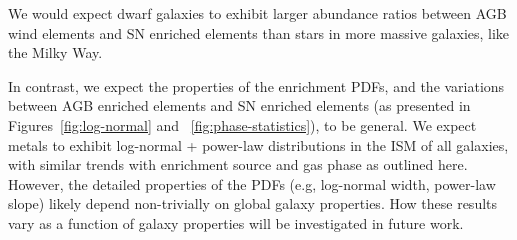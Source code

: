 We would expect dwarf galaxies to exhibit larger abundance ratios between AGB wind elements and SN enriched elements than stars in more massive galaxies, like the Milky Way.

In contrast, we expect the properties of the enrichment PDFs, and the variations between AGB enriched elements and SN enriched elements (as presented in Figures~\ref{fig:log-normal} and ~\ref{fig:phase-statistics}), to be general. We expect metals to exhibit log-normal + power-law distributions in the ISM of all galaxies, with similar trends with enrichment source and gas phase as outlined here. However, the detailed properties of the PDFs (e.g, log-normal width, power-law slope) likely depend non-trivially on global galaxy properties. How these results vary as a function of galaxy properties will be investigated in future work.

